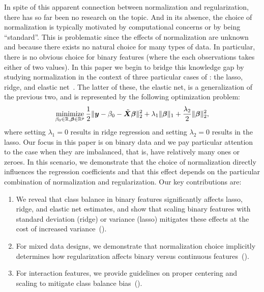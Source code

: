 In spite of this apparent connection between normalization and regularization, there has so
far been no research on the topic. And in its absence, the choice of normalization is
typically motivated by computational concerns or by being ``standard''. This is problematic
since the effects of normalization are unknown and because there exists no natural choice
for many types of data. In particular, there is no obvious choice for binary features
(where the each observations takes either of two values). In this paper we begin to bridge
this knowledge gap by studying normalization in the context of three particular cases of
: the lasso, ridge, and elastic net~\citep{zou2005}. The latter
of these, the elastic net, is a generalization of the previous two, and is represented by
the following optimization problem:
%
\begin{equation}
  \label{eq:elastic-net}
  \operatorname*{minimize}_{\beta_0 \in \mathbb{R},\bm{\beta} \in \mathbb{R}^p} \frac{1}{2} \lVert \bm y - \beta_0 - \tilde{\bm{X}}\bm{\beta} \rVert^2_2  + \lambda_1 \lVert \bm\beta \rVert_1 + \frac{\lambda_2}{2}\lVert \bm \beta \rVert_2^2,
\end{equation}
%
where setting \(\lambda_1 = 0\) results in ridge regression and setting \(\lambda_2 = 0\)
results in the lasso. Our focus in this paper is on binary data and we pay particular
attention to the case when they are imbalanced, that is, have relatively many ones or
zeroes. In this scenario, we demonstrate that the choice of normalization directly
influences the regression coefficients and that this effect depends on the particular
combination of normalization and regularization. Our key contributions are:
\begin{enumerate}
  \item We reveal that class balance in binary features significantly affects lasso, ridge, and
        elastic net estimates, and show that scaling binary features with standard deviation
        (ridge) or variance (lasso) mitigates these effects at the cost of increased
        variance~().
  \item For mixed data designs, we demonstrate that normalization choice implicitly determines how
        regularization affects binary versus continuous features~().
  \item For interaction features, we provide guidelines on proper centering and scaling to mitigate
        class balance bias~().
\end{enumerate}
